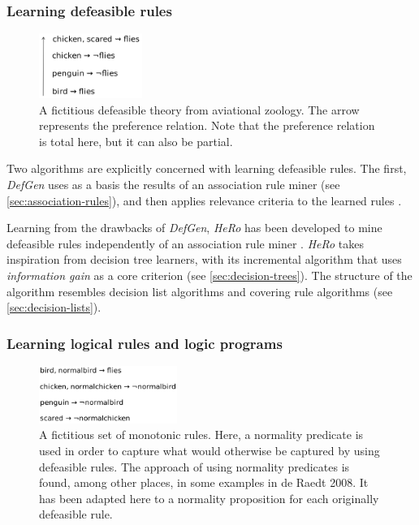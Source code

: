 \subsubsection{Learning defeasible rules}\label{sec:defeasible-rules}

\begin{figure}[htb]
        \centering
        \includegraphics[width=0.3\textwidth]{images/defeasible-theory.png}
        \caption{A fictitious defeasible theory from aviational zoology. The arrow represents the preference relation. Note that the preference relation is total here, but it can also be partial.}
        \label{fig:defeasible-rules}
\end{figure}

Two algorithms are explicitly concerned with learning defeasible rules. The first, \textit{DefGen} uses as a basis the results of an association rule miner (see \autoref{sec:association-rules}), and then applies relevance criteria to the learned rules \cite{governatoriApplicationAssociationRules2001}.

Learning from the drawbacks of \textit{DefGen}, \textit{HeRo} has been developed to mine defeasible rules independently of an association rule miner \cite{johnstonAlgorithmInductionDefeasible2003}. \textit{HeRo} takes inspiration from decision tree learners, with its incremental algorithm that uses \textit{information gain} as a core criterion (see \autoref{sec:decision-trees}). The structure of the algorithm resembles decision list algorithms and covering rule algorithms (see \autoref{sec:decision-lists}).

\subsubsection{Learning logical rules and logic programs}

\begin{figure}[htb]
        \centering
        \includegraphics[width=0.4\textwidth]{images/monotonic-theory.png}
        \caption{A fictitious set of monotonic rules. Here, a normality predicate is used in order to capture what would otherwise be captured by using defeasible rules. The approach of using normality predicates is found, among other places, in some examples in de Raedt 2008. It has been adapted here to a normality proposition for each originally defeasible rule.}
        \label{fig:relational}
\end{figure}

